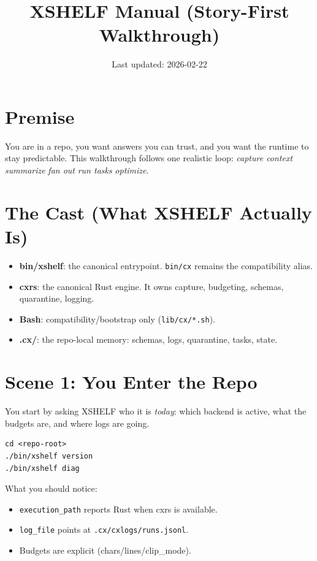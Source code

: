 \documentclass[11pt]{article}
\title{XSHELF Manual (Story-First Walkthrough)}
\author{}
\date{Last updated: 2026-02-22}
\begin{document}
\maketitle
\vspace{-0.6em}

\section*{Premise}
You are in a repo, you want answers you can trust, and you want the runtime to stay predictable.
This walkthrough follows one realistic loop: \emph{capture context} \textrightarrow{} \emph{summarize}
\textrightarrow{} \emph{fan out} \textrightarrow{} \emph{run tasks} \textrightarrow{} \emph{optimize}.

\section{The Cast (What XSHELF Actually Is)}
\begin{itemize}
  \item \textbf{bin/xshelf}: the canonical entrypoint. \texttt{bin/cx} remains the compatibility alias.
  \item \textbf{cxrs}: the canonical Rust engine. It owns capture, budgeting, schemas, quarantine, logging.
  \item \textbf{Bash}: compatibility/bootstrap only (\texttt{lib/cx/*.sh}).
  \item \textbf{.cx/}: the repo-local memory: schemas, logs, quarantine, tasks, state.
\end{itemize}

\section{Scene 1: You Enter the Repo}
You start by asking XSHELF who it is \emph{today}: which backend is active, what the budgets are, and
where logs are going.

\begin{lstlisting}[style=cx]
cd <repo-root>
./bin/xshelf version
./bin/xshelf diag
\end{lstlisting}

What you should notice:
\begin{itemize}
  \item \texttt{execution\_path} reports Rust when cxrs is available.
  \item \texttt{log\_file} points at \texttt{.cx/cxlogs/runs.jsonl}.
  \item Budgets are explicit (chars/lines/clip\_mode).
\end{itemize}
\end{document}
